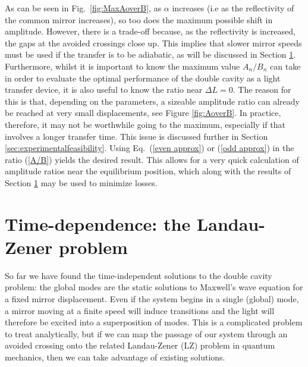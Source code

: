 \documentclass[twocolumn,english,pra,aps,superscriptaddress,floatfix]{revtex4-1}
\begin{document}
As can be seen in Fig.\ \ref{fig:MaxAoverB}, as $\alpha$ increases (i.e as the reflectivity of the common mirror increases), so too does the maximum possible shift in amplitude. However, there is a trade-off because, as the reflectivity is increased, the gaps at the avoided crossings close up. This implies that slower mirror speeds must be used if the transfer is to be adiabatic, as will be discussed in Section \ref{sec:LZ}. 
Furthermore, whilst it is important to know the maximum value $A_{n}/B_{n}$ can take in order to evaluate the optimal performance of the double cavity as a light transfer device,  it is also useful to 
 know the ratio near $\Delta L=0$.  The reason for this is that, depending on the parameters, a sizeable amplitude ratio can already be reached at very small displacements, see Figure \ref{fig:AoverB}.  In practice, therefore, it may not be worthwhile going to the maximum, especially if that involves a longer transfer time. This issue is discussed further in Section \ref{sec:experimentalfeasibility}.  Using Eq.\ (\ref{even approx}) or (\ref{odd approx}) in the ratio (\ref{A/B}) yields the desired result.  This allows for a very quick calculation of amplitude ratios near the equilibrium position, which along with the results of Section \ref{sec:LZ} may be used to minimize losses.








\section{Time-dependence: the Landau-Zener problem}
\label{sec:LZ}

So far we have found the time-independent solutions to the double cavity problem: the global modes are the static solutions to Maxwell's wave equation for a fixed mirror displacement.
Even if the system begins in a single (global) mode, a mirror moving at a finite speed will induce transitions and the light will therefore be excited into a superposition of modes. This is a complicated problem to treat analytically, but if we can map the passage of our system through an avoided crossing onto the related Landau-Zener (LZ) problem in quantum mechanics, then we can take advantage of existing solutions. 
\end{document}
